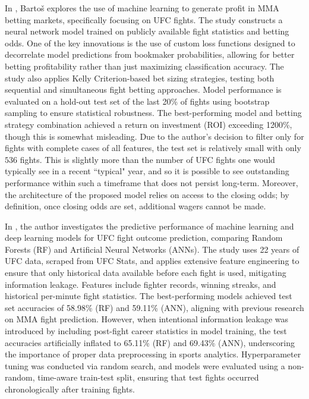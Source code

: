 \documentclass[12pt,twoside]{report}
\begin{document}
In \citep{bartos_2021}, Bartoš explores the use of machine learning to generate profit in MMA betting markets, specifically focusing on UFC fights. The study constructs a neural network model trained on publicly available fight statistics and betting odds. One of the key innovations is the use of custom loss functions designed to decorrelate model predictions from bookmaker probabilities, allowing for better betting profitability rather than just maximizing classification accuracy. The study also applies Kelly Criterion-based bet sizing strategies, testing both sequential and simultaneous fight betting approaches. Model performance is evaluated on a hold-out test set of the last 20\% of fights using bootstrap sampling to ensure statistical robustness. The best-performing model and betting strategy combination achieved a return on investment (ROI) exceeding 1200\%, though this is somewhat misleading. Due to the author's decision to filter only for fights with complete cases of all features, the test set is relatively small with only $536$ fights. This is slightly more than the number of UFC fights one would typically see in a recent ``typical" year, and so it is possible to see outstanding performance within such a timeframe that does not persist long-term. Moreover, the architecture of the proposed model relies on access to the closing odds; by definition, once closing odds are set, additional wagers cannot be made.

In \citep{turgut_2021}, the author investigates the predictive performance of machine learning and deep learning models for UFC fight outcome prediction, comparing Random Forests (RF) and Artificial Neural Networks (ANNs). The study uses 22 years of UFC data, scraped from UFC Stats, and applies extensive feature engineering to ensure that only historical data available before each fight is used, mitigating information leakage. Features include fighter records, winning streaks, and historical per-minute fight statistics. The best-performing models achieved test set accuracies of 58.98\% (RF) and 59.11\% (ANN), aligning with previous research on MMA fight prediction. However, when intentional information leakage was introduced by including post-fight career statistics in model training, the test accuracies artificially inflated to 65.11\% (RF) and 69.43\% (ANN), underscoring the importance of proper data preprocessing in sports analytics. Hyperparameter tuning was conducted via random search, and models were evaluated using a non-random, time-aware train-test split, ensuring that test fights occurred chronologically after training fights.
\end{document}
